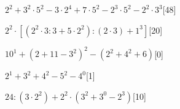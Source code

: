 \begin{esercizio} \label{ese:1.17}
\(2^2+3^2\cdot5^2-3\cdot2^4+7\cdot5^2-2^3\cdot5^2-2^2\cdot3^3\)\hfill[48]
\end{esercizio}
\begin{esercizio} \label{ese:1.17}
\(2^2\cdot[(2^2\cdot3:3+5\cdot2^2):(2\cdot3)+1^3]\)\hfill[20]
\end{esercizio}
\begin{esercizio} \label{ese:1.17}
\(10^1+(2+11-3^2)^2-(2^2+4^2+6)\)\hfill[0]
\end{esercizio}
\begin{esercizio} \label{ese:1.17}
\(2^1+3^2+4^2-5^2-4^0\)\hfill[1]
\end{esercizio}
\begin{esercizio} \label{ese:1.17}
\(24:(3\cdot2^2)+2^2\cdot(3^2+3^0-2^3)\)\hfill[10]
\end{esercizio}
